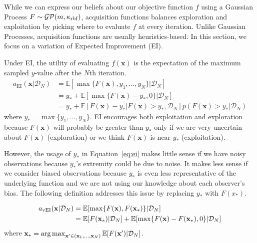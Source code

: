 While we can express our beliefs about our objective function $f$
using a Gaussian Process $F \sim \mathcal{GP}(m, \kappa_{\mathrm{rbf}})$,
acquisition functions balances exploration and exploitation
by picking where to evaluate $f$ at every iteration.
Unlike Gaussian Processes, acquisition functions are usually heuristics-based.
In this section, we focus on a variation of Expected Improvement (EI).

Under EI, the utility of evaluating $f(\mathbf{x})$ is the expectation of the maximum sampled $y$-value after the $N$th iteration.
\begin{align}
    \label{eq:ei}
    a_{\mathrm{EI}}(\mathbf{x} | \mathcal{D}_N) &= \mathbb{E}[\max\{F(\mathbf{x}), y_1, \dots, y_N\} | \mathcal{D}_N] \\
    & = y_* + \mathbb{E}[\max\{F(\mathbf{x}) - y_*, 0\} |\mathcal{D}_N] \\
    & = y_* + \mathbb{E}[F(\mathbf{x}) - y_* | F(\mathbf{x}) > y_*, \mathcal{D}_N]p(F(\mathbf{x}) > y_* | \mathcal{D}_N)
\end{align}
where $y_* = \max\{y_1, \dots, y_N\}$.
EI encourages both exploitation and exploration because $F(\mathbf{x})$ will probably be greater than $y_*$ only if we are very uncertain about $F(\mathbf{x})$ (exploration) or we think $F(\mathbf{x})$ is near $y_*$ (exploitation).

However, the usage of $y_*$ in Equation~\ref{eq:ei} makes little sense if we have noisy observations because $y_*$'s extremity could be due to noise.
It makes less sense if we consider biased observations because $y_*$ is even less representative of the underlying function and we are not using our knowledge about each observer's bias.
The following definition addresses this issue by replacing $y_*$ with $F(x_*)$.

\begin{definition}[vEI]
    \begin{align*}
        \begin{split}
        \label{eq:vei}
        a_{\mathrm{vEI}}(\mathbf{x} | \mathcal{D}_N) &= \mathbb{E}[\max \{ F(\mathbf{x}), F(\mathbf{x}_*) \} | \mathcal{D}_N] \\
        &= \mathbb{E}[F(\mathbf{x}_*) | \mathcal{D}_N] + \mathbb{E}[\max \{ F(\mathbf{x}) - F(\mathbf{x}_*), 0 \} | \mathcal{D}_N]
        \end{split}
    \end{align*}
    where $\mathbf{x}_* = \operatorname*{arg\,max}_{\mathbf{x'} \in (\mathbf{x}_1, \dots, \mathbf{x}_N)} \mathbb{E}[F(\mathbf{x'}) | \mathcal{D}_N]$.
\end{definition}

